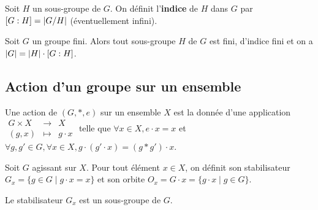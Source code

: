 	\begin{defn}
		Soit $H$ un sous-groupe de $G$.
		On définit l'\textbf{indice} de $H$ dans $G$ par $[G : H] = \left\lvert G/H\right\rvert$ (éventuellement infini).
	\end{defn}

	\begin{pop}
		Soit $G$ un groupe fini.
		Alors tout sous-groupe $H$ de $G$ est fini, d'indice fini et on a $\left\lvert G\right\rvert = \left\lvert H\right\rvert \cdot [G : H]$.
	\end{pop}


\subsection{Action d'un groupe sur un ensemble}

	\begin{defn}
		Une action de $(G,*,e)$ sur un ensemble $X$ est la donnée d'une application
		$\begin{array}{ccc} G \times X & \to & X \\ (g,x) & \mapsto & g \cdot x \end{array}$
		telle que $\forall x \in X, e \cdot x = x$ et $\forall g, g' \in G, \forall x \in X, g \cdot (g' \cdot x) = (g * g') \cdot x$.
	\end{defn}

	\begin{defn}
		Soit $G$ agissant sur $X$.
		Pour tout élément $x \in X$, on définit son stabilisateur $G_x = \{ g \in G \mid g \cdot x = x \}$ et son orbite $O_x = G \cdot x = \{ g \cdot x \mid g \in G \}$.
	\end{defn}

	\begin{pop}
		Le stabilisateur $G_x$ est un sous-groupe de $G$.
	\end{pop}

	
